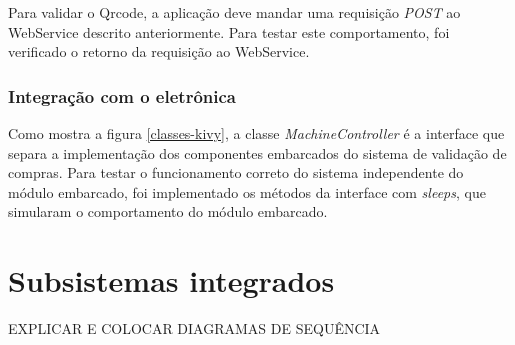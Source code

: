 Para validar o Qrcode, a aplicação deve mandar uma requisição \textit{POST} ao WebService descrito anteriormente. Para testar este comportamento, foi verificado o retorno da requisição ao WebService.

\subsubsection{Integração com o eletrônica}

Como mostra a figura \ref{classes-kivy}, a classe \textit{MachineController} é a interface que separa a implementação dos componentes embarcados do sistema de validação de compras. Para testar o funcionamento
correto do sistema independente do módulo embarcado, foi implementado os métodos da interface com
\textit{sleeps}, que simularam o comportamento do módulo embarcado.

\section{Subsistemas integrados}

EXPLICAR E COLOCAR DIAGRAMAS DE SEQUÊNCIA